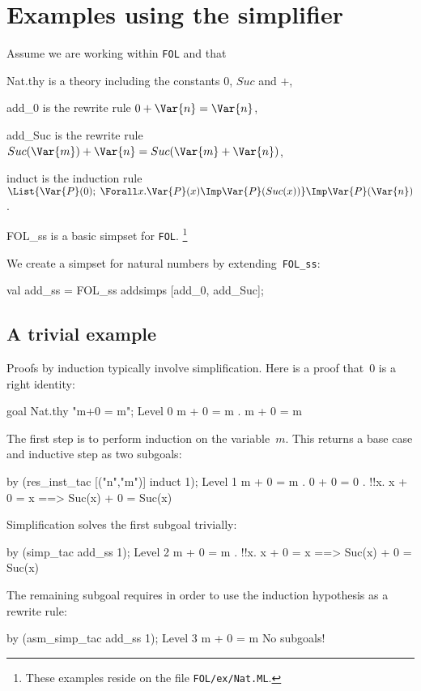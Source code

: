 \section{Examples using the simplifier}
Assume we are working within {\tt FOL} and that
\begin{ttdescription}
\item[Nat.thy] 
  is a theory including the constants $0$, $Suc$ and $+$,
\item[add_0]
  is the rewrite rule $0+\Var{n} = \Var{n}$,
\item[add_Suc]
  is the rewrite rule $Suc(\Var{m})+\Var{n} = Suc(\Var{m}+\Var{n})$,
\item[induct]
  is the induction rule $\List{\Var{P}(0);\; \Forall x. \Var{P}(x)\Imp
    \Var{P}(Suc(x))} \Imp \Var{P}(\Var{n})$.
\item[FOL_ss]
  is a basic simpset for {\tt FOL}.%
\footnote{These examples reside on the file {\tt FOL/ex/Nat.ML}.} 
\end{ttdescription}

We create a simpset for natural numbers by extending~{\tt FOL_ss}:
\begin{ttbox}
val add_ss = FOL_ss addsimps [add_0, add_Suc];
\end{ttbox}

\subsection{A trivial example}
Proofs by induction typically involve simplification.  Here is a proof
that~0 is a right identity:
\begin{ttbox}
goal Nat.thy "m+0 = m";
{\out Level 0}
{\out m + 0 = m}
{. m + 0 = m}
\end{ttbox}
The first step is to perform induction on the variable~$m$.  This returns a
base case and inductive step as two subgoals:
\begin{ttbox}
by (res_inst_tac [("n","m")] induct 1);
{\out Level 1}
{\out m + 0 = m}
{. 0 + 0 = 0}
{. !!x. x + 0 = x ==> Suc(x) + 0 = Suc(x)}
\end{ttbox}
Simplification solves the first subgoal trivially:
\begin{ttbox}
by (simp_tac add_ss 1);
{\out Level 2}
{\out m + 0 = m}
{. !!x. x + 0 = x ==> Suc(x) + 0 = Suc(x)}
\end{ttbox}
The remaining subgoal requires  in order to use the
induction hypothesis as a rewrite rule:
\begin{ttbox}
by (asm_simp_tac add_ss 1);
{\out Level 3}
{\out m + 0 = m}
{\out No subgoals!}
\end{ttbox}

